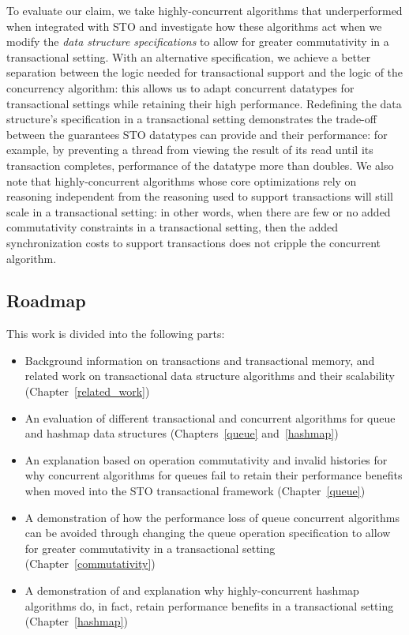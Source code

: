 To evaluate our claim, we take highly-concurrent algorithms that underperformed when integrated with STO and investigate how these algorithms act when we modify the \emph{data structure specifications} to allow for greater commutativity in a transactional setting. With an alternative specification, we achieve a better separation between the logic needed for transactional support and the logic of the concurrency algorithm: this allows us to adapt concurrent datatypes for transactional settings while retaining their high performance.
Redefining the data structure's specification in a transactional setting demonstrates the trade-off between the guarantees STO datatypes can provide and their performance: for example, by preventing a thread from viewing the result of its read until its transaction completes, performance of the datatype more than doubles.
We also note that highly-concurrent algorithms whose core optimizations rely on reasoning independent from the reasoning used to support transactions will still scale in a transactional setting: in other words, when there are few or no added commutativity constraints in a transactional setting, then the added synchronization costs to support transactions does not cripple the concurrent algorithm.

\subsection{Roadmap}
This work is divided into the following parts: 
\begin{itemize}
    \item Background information on transactions and transactional memory, and related work on transactional data structure algorithms and their scalability (Chapter~\ref{related_work})
    \item An evaluation of different transactional and concurrent algorithms for queue and hashmap data structures (Chapters~\ref{queue} and~\ref{hashmap})
    \item An explanation based on operation commutativity and invalid histories for why concurrent algorithms for queues fail to retain their performance benefits when moved into the STO transactional framework (Chapter~\ref{queue})
    \item A demonstration of how the performance loss of queue concurrent algorithms can be avoided through changing the queue operation specification to allow for greater commutativity in a transactional setting (Chapter~\ref{commutativity})
    \item A demonstration of and explanation why highly-concurrent hashmap algorithms do, in fact, retain performance benefits in a transactional setting (Chapter~\ref{hashmap})
\end{itemize}
